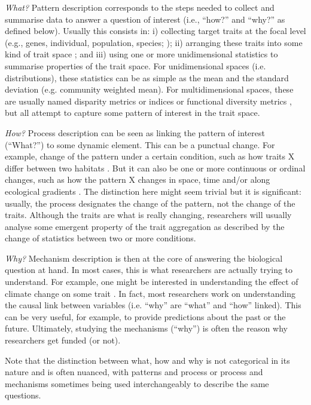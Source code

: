 \documentclass[12pt,letterpaper]{article}
\begin{document}
\textit{What?} Pattern description corresponds to the steps needed to collect and summarise data to answer a question of interest (i.e., ``how?'' and ``why?'' as defined below).
Usually this consists in: i) collecting target traits at the focal level (e.g., genes, individual, population, species; \citealt{violle2007let}); ii) arranging these traits into some kind of trait space \citep{guillerme2020disparities, mammola2021concepts}; and iii) using one or more unidimensional statistics to summarise properties of the trait space.
For unidimensional spaces (i.e. distributions), these statistics can be as simple as the mean and the standard deviation (e.g. community weighted mean).
For multidimensional spaces, these are usually named disparity metrics or indices \citep{guillerme2020disparities} or functional diversity metrics \citep{mammola2021concepts}, but all attempt to capture some pattern of interest in the trait space.

\textit{How?} Process description can be seen as linking the pattern of interest (``What?'') to some dynamic element.
This can be a punctual change.
For example, change of the pattern under a certain condition, such as how traits X differ between two habitats \citep{martinez2021habitat}.
But it can also be one or more continuous or ordinal changes, such as how the pattern X changes in space, time and/or along ecological gradients \citep{belmaker2013spatial, jarzyna2018taxonomic,lamanna2014functional,bjorkman2018plant,mclean2021trait}.
The distinction here might seem trivial but it is significant: usually, the process designates the change of the pattern, not the change of the traits.
Although the traits are what is really changing, researchers will usually analyse some emergent property of the trait aggregation as described by the change of statistics between two or more conditions.

\textit{Why?} Mechanism description is then at the core of answering the biological question at hand.
In most cases, this is what researchers are actually trying to understand.
For example, one might be interested in understanding the effect of climate change on some trait \citep{boonman2022trait}.
In fact, most researchers work on understanding the causal link between variables (i.e. ``why'' are ``what'' and ``how'' linked).
This can be very useful, for example, to provide predictions about the past or the future.
Ultimately, studying the mechanisms (``why'') is often the reason why researchers get funded (or not).

Note that the distinction between what, how and why is not categorical in its nature and is often nuanced, with patterns and process or process and mechanisms sometimes being used interchangeably to describe the same questions.
\end{document}
